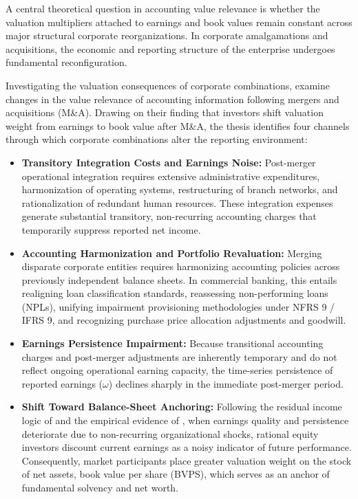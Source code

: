 A central theoretical question in accounting value relevance is whether the valuation multipliers attached to earnings and book values remain constant across major structural corporate reorganizations. In corporate amalgamations and acquisitions, the economic and reporting structure of the enterprise undergoes fundamental reconfiguration.

Investigating the valuation consequences of corporate combinations, \citet{kwon2020} examine changes in the value relevance of accounting information following mergers and acquisitions (M\&A). Drawing on their finding that investors shift valuation weight from earnings to book value after M\&A, the thesis identifies four channels through which corporate combinations alter the reporting environment:
\begin{itemize}
\item \textbf{Transitory Integration Costs and Earnings Noise:} Post-merger operational integration requires extensive administrative expenditures, harmonization of operating systems, restructuring of branch networks, and rationalization of redundant human resources. These integration expenses generate substantial transitory, non-recurring accounting charges that temporarily suppress reported net income.
\item \textbf{Accounting Harmonization and Portfolio Revaluation:} Merging disparate corporate entities requires harmonizing accounting policies across previously independent balance sheets. In commercial banking, this entails realigning loan classification standards, reassessing non-performing loans (NPLs), unifying impairment provisioning methodologies under NFRS 9 / IFRS 9, and recognizing purchase price allocation adjustments and goodwill.
\item \textbf{Earnings Persistence Impairment:} Because transitional accounting charges and post-merger adjustments are inherently temporary and do not reflect ongoing operational earning capacity, the time-series persistence of reported earnings ($\omega$) declines sharply in the immediate post-merger period.
\item \textbf{Shift Toward Balance-Sheet Anchoring:} Following the residual income logic of \citet{ohlson1995} and the empirical evidence of \citet{collins1997}, when earnings quality and persistence deteriorate due to non-recurring organizational shocks, rational equity investors discount current earnings as a noisy indicator of future performance. Consequently, market participants place greater valuation weight on the stock of net assets, book value per share (BVPS), which serves as an anchor of fundamental solvency and net worth.
\end{itemize}

